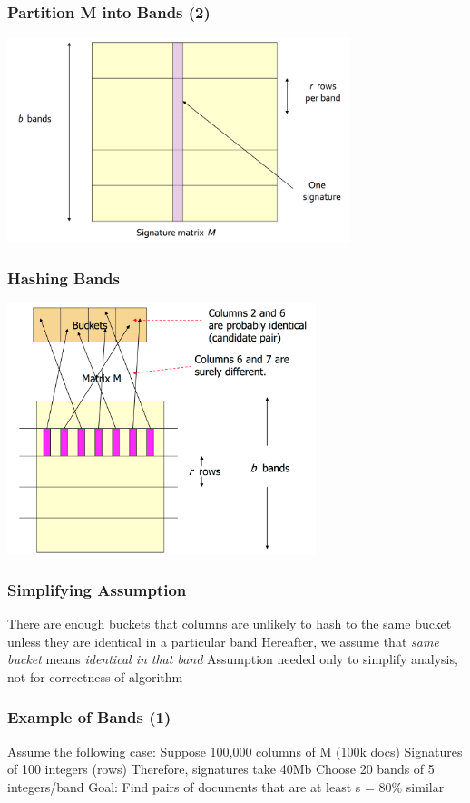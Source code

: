 \documentclass[svgnames]{beamer}
\begin{document}
\begin{frame} \frametitle{Partition M into Bands (2)}

\includegraphics[width=10cm]{bands}

\end{frame}

  
\begin{frame} \frametitle{Hashing Bands}

\includegraphics[width=9cm]{hashing-bands}

\end{frame}

  
\begin{frame} \frametitle{Simplifying Assumption}

There are enough buckets that columns are unlikely to hash to the same bucket unless they are identical in a particular band
Hereafter, we assume that \emph{same bucket} means \emph{identical in that band}
Assumption needed only to simplify analysis, not for correctness of algorithm

\end{frame}

  
\begin{frame} \frametitle{Example of Bands (1)}

Assume the following case:
  Suppose 100,000 columns of M (100k docs)
  Signatures of 100 integers (rows)
  Therefore, signatures take 40Mb
  Choose 20 bands of 5 integers/band
Goal: Find pairs of documents that are at least s = 80\% similar

\end{frame}
\end{document}
